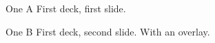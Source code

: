 \documentclass{beamer}
\begin{document}
\begin{frame}{One A}
  First deck, first slide.
\end{frame}

\begin{frame}{One B}
  First deck, second slide.
  \pause
  With an overlay.
\end{frame}
\end{document}

